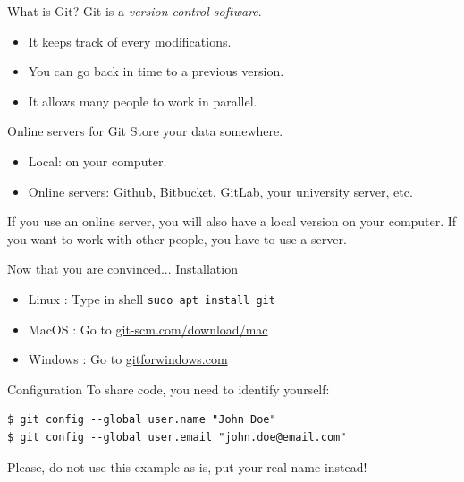 \documentclass{beamer}
\newcommand{\cmd}[1]{\fbox{\color{black}\texttt{#1}}}
\begin{document}
	\begin{frame}{What is Git?}
		Git is a \textit{version control software}. \newline
		
		\begin{itemize}
			\item It keeps track of every modifications.
			\item You can go back in time to a previous version.
			\item It allows many people to work in parallel.
		\end{itemize}	
	\end{frame}

	\begin{frame}{Online servers for Git}
		Store your data somewhere. \newline 
			\begin{itemize}
				\item Local: on your computer.
				\item Online servers: Github, Bitbucket, GitLab, your university server, etc. \newline
			\end{itemize}
		If you use an online server, you will also have a local version on your computer. If you want to work with other people, you have to use a server. 
	\end{frame}

	\begin{frame}{Now that you are convinced... Installation}
		\begin{itemize}
			\item Linux : Type in shell \texttt{sudo apt install git}
			\item MacOS : Go to \url{git-scm.com/download/mac}
			\item Windows : Go to \url{gitforwindows.com}
		\end{itemize}
	\end{frame}

	\begin{frame}[fragile]{Configuration \hfill \cmd{config}}
	To share code, you need to identify yourself:
	\begin{verbatim}
$ git config --global user.name "John Doe"
$ git config --global user.email "john.doe@email.com"
	\end{verbatim}
	Please, do not use this example as is, put your real name instead!
	\end{frame}
\end{document}
